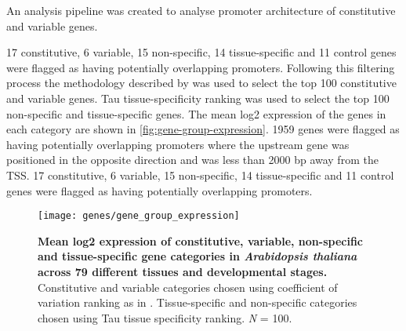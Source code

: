 \documentclass[../main.tex]{subfiles}
\begin{document}
An analysis pipeline was created to analyse promoter architecture of constitutive and variable genes.

17 constitutive, 6 variable, 15 non\hyp{}specific, 14 tissue\hyp{}specific and 11 control genes were flagged as having potentially overlapping promoters.
Following this filtering process the methodology described by \textcite{czechowskiGenomeWideIdentificationTesting2005} was used to select the top 100 constitutive and variable genes.
Tau tissue\hyp{}specificity ranking was used to select the top 100  non\hyp{}specific and tissue\hyp{}specific genes.
The mean log2 expression of the genes in each category are shown in \autoref{fig:gene-group-expression}.
1959 genes were flagged as having potentially overlapping promoters where the upstream gene was positioned in the opposite direction and was less than 2000 bp away from the TSS.
17 constitutive, 6 variable, 15 non\hyp{}specific, 14 tissue\hyp{}specific and 11 control genes were flagged as having potentially overlapping promoters.


\begin{figure}[hbt!]
	\begin{center}
		\capstart
		\texttt{[image: genes/gene\_group\_expression]}
		\caption{
			\textbf{Mean log2 expression of constitutive, variable, non\hyp{}specific and tissue\hyp{}specific gene categories in \textit{Arabidopsis thaliana} across 79 different tissues and developmental stages.}
			Constitutive and variable categories chosen using coefficient of variation ranking as in \textcite{czechowskiGenomeWideIdentificationTesting2005}.
			Tissue\hyp{}specific and non\hyp{}specific categories chosen using Tau tissue specificity ranking. \textit{N} = 100.				
			\label{fig:gene-group-expression}
		}
	\end{center}
\end{figure}
\end{document}
